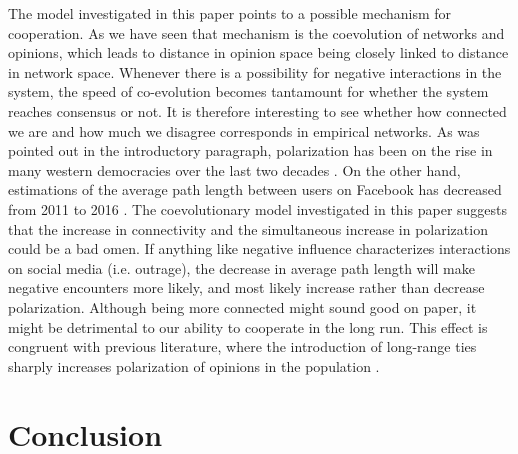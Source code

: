 \documentclass{article}
\begin{document}
The model investigated in this paper points to a possible mechanism for cooperation. 
As we have seen that mechanism is the coevolution of networks and opinions, which leads to distance in opinion space being closely linked to distance in network space. 
Whenever there is a possibility for negative interactions in the system, the speed of co-evolution becomes tantamount for whether the system reaches consensus or not. 
It is therefore interesting to see whether how connected we are and how much we disagree corresponds in empirical networks. 
As was pointed out in the introductory paragraph, polarization has been on the rise in many western democracies over the last two decades \cite{boxell_cross-country_2020,pew_research_center_political_2014}. On the other hand, estimations of the average path length between users on Facebook has decreased from 2011 to 2016 \cite{bhagat_three_2016}. The coevolutionary model investigated in this paper suggests that the increase in connectivity and the simultaneous increase in polarization could be a bad omen. If anything like negative influence characterizes interactions on social media (i.e. outrage), the decrease in average path length will make negative encounters more likely, and most likely increase rather than decrease polarization. Although being more connected might sound good on paper, it might be detrimental to our ability to cooperate in the long run. This effect is congruent with previous literature, where the introduction of long-range ties sharply increases polarization of opinions in the population \cite{flache_small_2011,turner_paths_2018}.

\section{Conclusion}




\end{document}
